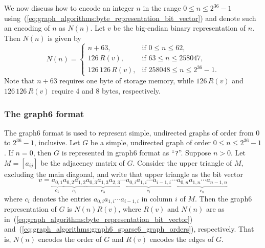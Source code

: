 We now discuss how to encode an integer $n$ in the range
$0 \leq n \leq 2^{36} - 1$
using~(\ref{eq:graph_algorithms:byte_representation_bit_vector}) and
denote such an encoding of $n$ as $N(n)$. Let $v$ be the big-endian
binary representation of $n$. Then $N(n)$ is given by
%
\begin{equation}
\label{eq:graph_algorithms:graph6_sparse6_graph_orders}
N(n)
=
\begin{cases}
n + 63, & \text{if $0 \leq n \leq 62$}, \\
126 \, R(v), & \text{if $63 \leq n \leq 258047$}, \\
126 \, 126 \, R(v), & \text{if $258048 \leq n \leq 2^{36}-1$}.
\end{cases}
\end{equation}
Note that $n + 63$ requires one byte of storage memory, while
$126 \, R(v)$ and $126 \, 126 \, R(v)$ require 4 and 8 bytes,
respectively.



\subsubsection{The graph6 format}

The graph6 format is used to represent simple, undirected graphs of
order from $0$ to $2^{36} - 1$, inclusive. Let $G$ be a simple,
undirected graph of order $0 \leq n \leq 2^{36} - 1$. If $n = 0$, then
$G$ is represented in graph6 format as ``\verb!?!''. Suppose $n >
0$. Let $M = [a_{ij}]$ be the adjacency matrix of $G$. Consider the
upper triangle of $M$, excluding the main diagonal, and write that
upper triangle as the bit vector
\[
v
=
\underbrace{a_{0,1}}_{c_1}
\underbrace{a_{0,2} a_{1,2}}_{c_2}
\underbrace{a_{0,3} a_{1,3} a_{2,3}}_{c_3} \cdots
\underbrace{a_{0,i} a_{1,i} \cdots a_{i-1,i}}_{c_i} \cdots
\underbrace{a_{0,n} a_{1,n} \cdots a_{n-1,n}}_{c_n}
\]
where $c_i$ denotes the entries $a_{0,i} a_{1,i} \cdots a_{i-1,i}$ in
column $i$ of $M$. Then the graph6 representation of $G$ is
$N(n) R(v)$, where $R(v)$ and $N(n)$ are as
in~(\ref{eq:graph_algorithms:byte_representation_bit_vector})
and~(\ref{eq:graph_algorithms:graph6_sparse6_graph_orders}),
respectively. That is, $N(n)$ encodes the order of $G$ and $R(v)$
encodes the edges of $G$.


